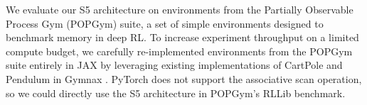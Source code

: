\documentclass{article}
\newcommand{\oldop}{\bullet}
\newcommand{\newop}{\oplus}
\begin{document}

We evaluate our S5 architecture on environments from the Partially Observable Process Gym (POPGym) \cite{morad2023popgym} suite, a set of simple environments designed to benchmark memory in deep RL. To increase experiment throughput on a limited compute budget, we carefully re-implemented environments from the POPGym suite entirely in JAX \cite{jax2018github} by leveraging existing implementations of CartPole and Pendulum in Gymnax \cite{gymnax2022github}. PyTorch does not support the associative scan operation, so we could directly use the S5 architecture in POPGym's RLLib benchmark.
\end{document}
